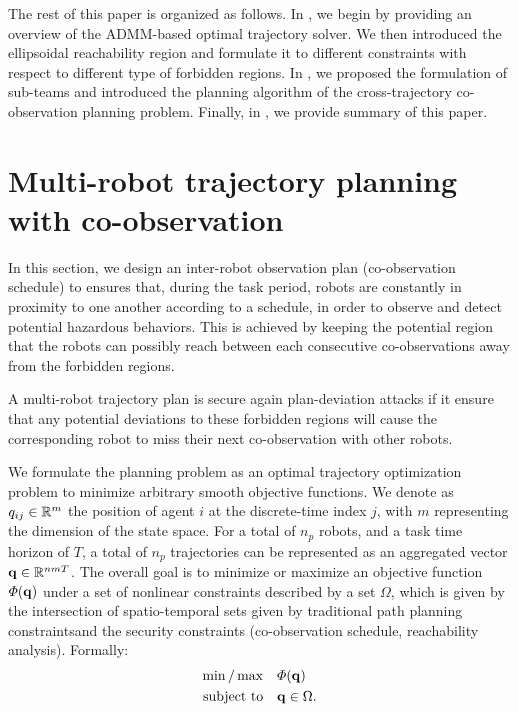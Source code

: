 \documentclass[10pt,twocolumn,twoside]{IEEEtran}
\begin{document}
\noindent{}
The rest of this paper is organized as follows. In , we begin by providing an overview of the ADMM-based optimal trajectory solver. We then introduced the ellipsoidal reachability region and formulate it to different constraints with respect to different type of forbidden regions. In , we proposed the formulation of sub-teams and introduced the planning algorithm of the cross-trajectory co-observation planning problem. Finally, in , we provide summary of this paper.

\section{Multi-robot trajectory planning with co-observation}\label{sec:ADMM-planning}

In this section, we design an inter-robot observation plan (co-observation schedule) to ensures that, during the task period, robots are constantly in proximity to one another according to a schedule, in order to observe and detect potential hazardous behaviors. 
This is achieved by keeping the potential region that the robots can possibly reach between each consecutive co-observations away from the forbidden regions. 
\begin{definition}\label{def:secured-plan}
  A multi-robot trajectory plan is secure again plan-deviation attacks if it ensure that any potential deviations to these forbidden regions will cause the corresponding robot to miss their next co-observation with other robots. 
\end{definition}


We formulate the planning problem as an optimal trajectory optimization problem to minimize arbitrary smooth objective functions. We denote as $q_{ij}\in\mathbb{R}^{m}{}$ the position of agent $i$ at the discrete-time index $j$, with $m$ representing the dimension of the state space. For a total of $n_p$ robots, and a task time horizon of $T$, a total of $n_p$ trajectories can be represented as an aggregated vector $\mathbf{q}\in \mathbb{R}^{n m T}{}$. 
The overall goal is to minimize or maximize an objective function $\varPhi(\mathbf{q})$ under a set of nonlinear constraints described by a set $\Omega$, which is given by the intersection of spatio-temporal sets given by traditional path planning constraintsand the security constraints (co-observation schedule, reachability analysis). Formally:
\begin{equation}\label{eq:general-problem}
	\begin{split}
		\min/\max & \quad \varPhi(\mathbf{q})\\
		\textrm{subject to} &\quad \mathbf{q} \in \Omega.
	\end{split}
\end{equation}
\end{document}
